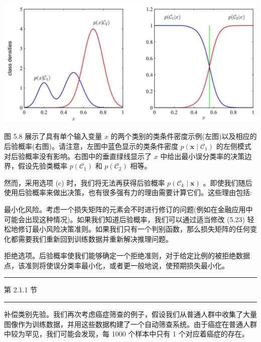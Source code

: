 \documentclass[10pt]{article}
\newcommand{\HRule}{\begin{center}\rule{0.9\linewidth}{0.2mm}\end{center}}
\begin{document}
\begin{center}
\includegraphics[max width=1.0\textwidth]{images/0194e279-9b28-703a-88f4-c3ac21e2010d_164_234_363_1297_607_0.jpg}
\end{center}
\hspace*{3em} 

图 5.8 展示了具有单个输入变量 \(x\) 的两个类别的类条件密度示例(左图)以及相应的后验概率(右图)。请注意，左图中蓝色显示的类条件密度 \(p\left( {\mathbf{x} \mid  {\mathcal{C}}_{1}}\right)\) 的左侧模式对后验概率没有影响。右图中的垂直绿线显示了 \(x\) 中给出最小误分类率的决策边界，假设先验类概率 \(p\left( {\mathcal{C}}_{1}\right)\) 和 \(p\left( {\mathcal{C}}_{2}\right)\) 相等。

然而，采用选项 (c) 时，我们将无法再获得后验概率 \(p\left( {{\mathcal{C}}_{k} \mid  \mathbf{x}}\right)\) 。即使我们随后使用后验概率来做出决策，也有很多强有力的理由需要计算它们。这些理由包括:

最小化风险。考虑一个损失矩阵的元素会不时进行修订的问题(例如在金融应用中可能会出现这种情况)。如果我们知道后验概率，我们可以通过适当修改 (5.23) 轻松地修订最小风险决策准则。如果我们只有一个判别函数，那么损失矩阵的任何变化都需要我们重新回到训练数据并重新解决推理问题。

拒绝选项。后验概率使我们能够确定一个拒绝准则，对于给定比例的被拒绝数据点，该准则将使误分类率最小化，或者更一般地说，使预期损失最小化。

\HRule

第 2.1.1 节

\HRule

补偿类别先验。我们再次考虑癌症筛查的例子，假设我们从普通人群中收集了大量图像作为训练数据，并用这些数据构建了一个自动筛查系统。由于癌症在普通人群中较为罕见，我们可能会发现，每 1000 个样本中只有 1 个对应着癌症的存在。
\end{document}
